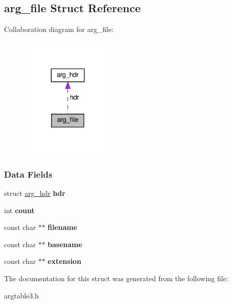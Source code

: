 \hypertarget{structarg__file}{}\subsection{arg\+\_\+file Struct Reference}
\label{structarg__file}


Collaboration diagram for arg\+\_\+file\+:\nopagebreak
\begin{figure}[H]
\begin{center}
\leavevmode
\includegraphics[width=129pt]{structarg__file__coll__graph}
\end{center}
\end{figure}
\subsubsection*{Data Fields}
\begin{DoxyCompactItemize}
\item 
\mbox{\label{structarg__file_af4b8905c8b0417777376938221d4e42f}} 
struct \hyperlink{structarg__hdr}{arg\+\_\+hdr} {\bfseries hdr}
\item 
\mbox{\label{structarg__file_a5390027dbb693cbcc7630c96e5bdde83}} 
int {\bfseries count}
\item 
\mbox{\label{structarg__file_a7822e37591de9d9a5ce78ed1f69b9bdc}} 
const char $\ast$$\ast$ {\bfseries filename}
\item 
\mbox{\label{structarg__file_a0765b5bbb8698b4e4c93b8613010568b}} 
const char $\ast$$\ast$ {\bfseries basename}
\item 
\mbox{\label{structarg__file_a99aa017b9d7de188ad939653effae3e9}} 
const char $\ast$$\ast$ {\bfseries extension}
\end{DoxyCompactItemize}


The documentation for this struct was generated from the following file\+:\begin{DoxyCompactItemize}
\item 
argtable3.\+h\end{DoxyCompactItemize}

